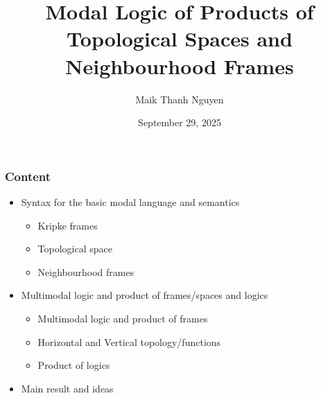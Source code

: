 \documentclass[hyperref={pdfpagelabels=false},t,10pt]{beamer}
\date{September 29, 2025}
\title{Modal Logic of Products of Topological Spaces and Neighbourhood Frames}
\author{Maik Thanh Nguyen}
\institute{Technische Universit\"at Dresden}
\begin{document}
\addtocounter{framenumber}{-1}
\maketitle

\begin{frame}
  \frametitle{Content}

  \begin{itemize}
  \item Syntax for the basic modal language and semantics
    \begin{itemize}
        \item Kripke frames
        \item Topological space
        \item Neighbourhood frames
     \end{itemize}
  \item Multimodal logic and product of frames/spaces and logics
    \begin{itemize}
      \item Multimodal logic and product of frames
      \item Horizontal and Vertical topology/functions
      \item Product of logics
    \end{itemize}
  \item Main result and ideas
  \end{itemize}
\end{frame}
\end{document}
